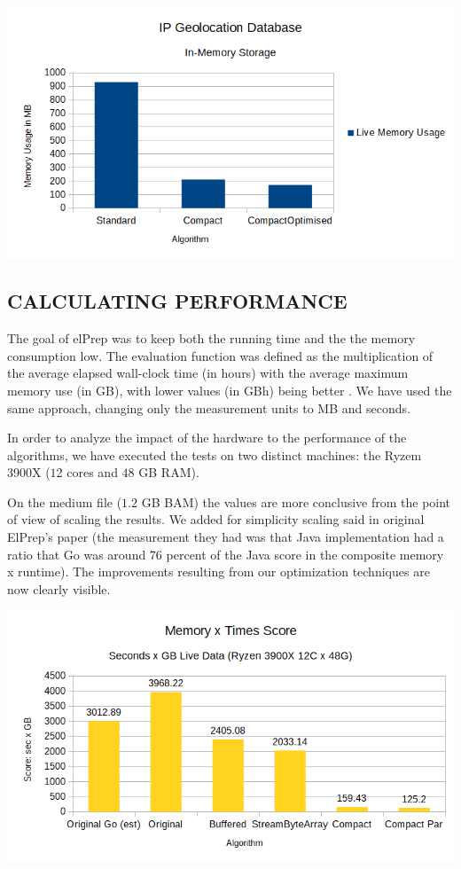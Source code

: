 \documentclass[a4paper,twoside]{article}
\begin{document}
\begin{center}
	\includegraphics[scale=0.5]{images/Geolocation_Chart.png}
\end{center}

 
\subsection{\uppercase{Calculating Performance}}
\label{subsec:performance}
The goal of elPrep was to keep both the running time and the the memory consumption low. The evaluation function was defined as the multiplication of the average elapsed wall-clock time (in hours) with the average maximum memory use (in GB), with lower values (in GBh) being better \cite{costanza:2019}.
We have used the same approach, changing only the measurement units to MB and seconds.

In order to analyze the impact of the hardware to the performance of the algorithms, we have executed the tests on two distinct machines: the Ryzem 3900X ($1$2 cores and $48$ GB RAM).

On the medium file ($1.2$ GB BAM) the values are more conclusive from the point of view of scaling the results. We added for simplicity scaling said in original ElPrep's paper (the measurement they had was that Java implementation had a ratio that Go was around 76 percent of the Java score in the composite memory x runtime). The improvements resulting from our optimization techniques are now clearly visible. 

\begin{center}
	\includegraphics[scale=0.5]{images/times_and_memory_chart.png}
\end{center}
\end{document}
